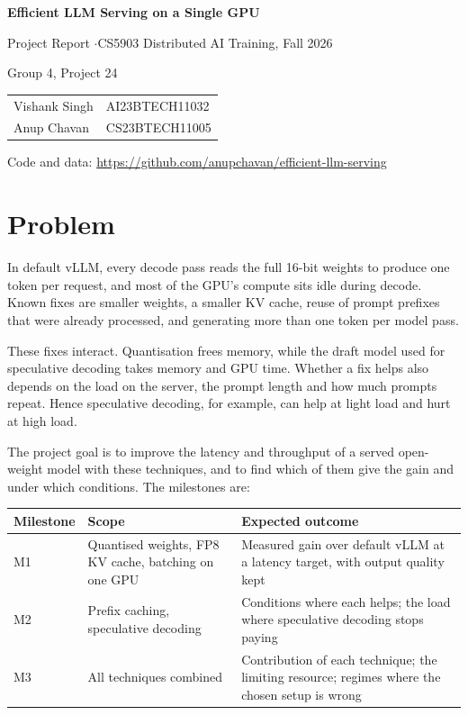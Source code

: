 \documentclass[11pt,a4paper]{article}
\begin{document}
\begin{center}
{\Large\bfseries Efficient LLM Serving on a Single GPU\par}
\vspace{.3em}
{Project Report \quad$\cdot$\quad CS5903 Distributed AI Training, Fall 2026\par}
\vspace{.3em}
{Group 4, Project 24\par}
\vspace{.5em}
\begin{tabular}{ll}
Vishank Singh & AI23BTECH11032\\
Anup Chavan & CS23BTECH11005
\end{tabular}\par
\vspace{.5em}
Code and data: \url{https://github.com/anupchavan/efficient-llm-serving}
\end{center}

\section{Problem}

In default vLLM, every decode pass reads the full 16-bit weights to produce one token per request, and most of the GPU's compute sits idle during decode. Known fixes are smaller weights, a smaller KV cache, reuse of prompt prefixes that were already processed, and generating more than one token per model pass.

These fixes interact. Quantisation frees memory, while the draft model used for speculative decoding takes memory and GPU time. Whether a fix helps also depends on the load on the server, the prompt length and how much prompts repeat. Hence speculative decoding, for example, can help at light load and hurt at high load.

The project goal is to improve the latency and throughput of a served open-weight model with these techniques, and to find which of them give the gain and under which conditions. The milestones are:

\begin{tabularx}{\linewidth}{@{}P{1.6cm}P{5.0cm}X@{}}
\toprule
Milestone & Scope & Expected outcome\\
\midrule
M1 & Quantised weights, FP8 KV cache, batching on one GPU & Measured gain over default vLLM at a latency target, with output quality kept\\
M2 & Prefix caching, speculative decoding & Conditions where each helps; the load where speculative decoding stops paying\\
M3 & All techniques combined & Contribution of each technique; the limiting resource; regimes where the chosen setup is wrong\\
\bottomrule
\end{tabularx}
\end{document}
